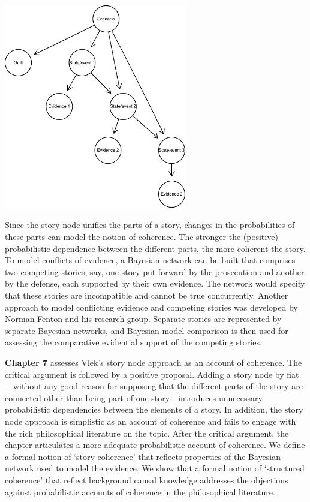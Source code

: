 \documentclass[
  10pt,
  dvipsnames,enabledeprecatedfontcommands]{scrartcl}
\begin{document}
\vspace{-2mm}

\begin{center}
\includegraphics[width=8cm]{vlek-scenario-node.pdf}
 \end{center}

\vspace{-2mm}

\noindent Since the story node unifies the parts of a story, changes in
the probabilities of these parts can model the notion of coherence. The
stronger the (positive) probabilistic dependence between the different
parts, the more coherent the story. To model conflicts of evidence, a
Bayesian network can be built that comprises two competing stories, say,
one story put forward by the prosecution and another by the defense,
each supported by their own evidence. The network would specify that
these stories are incompatible and cannot be true concurrently. Another
approach to model conflicting evidence and competing stories was
developed by Norman Fenton and his research group. Separate stories are
represented by separate Bayesian networks, and Bayesian model comparison
is then used for assessing the comparative evidential support of the
competing stories.

\textbf{Chapter 7} assesses Vlek's story node approach as an account of
coherence. The critical argument is followed by a positive proposal.
Adding a story node by fiat---without any good reason for supposing that
the different parts of the story are connected other than being part of
one story---introduces unnecessary probabilistic dependencies between
the elements of a story. In addition, the story node approach is
simplistic as an account of coherence and fails to engage with the rich
philosophical literature on the topic. After the critical argument, the
chapter articulates a more adequate probabilistic account of coherence.
We define a formal notion of `story coherence' that reflects properties
of the Bayesian network used to model the evidence. We show that a
formal notion of `structured coherence' that reflect background causal
knowledge addresses the objections against probabilistic accounts of
coherence in the philosophical literature.
\end{document}
